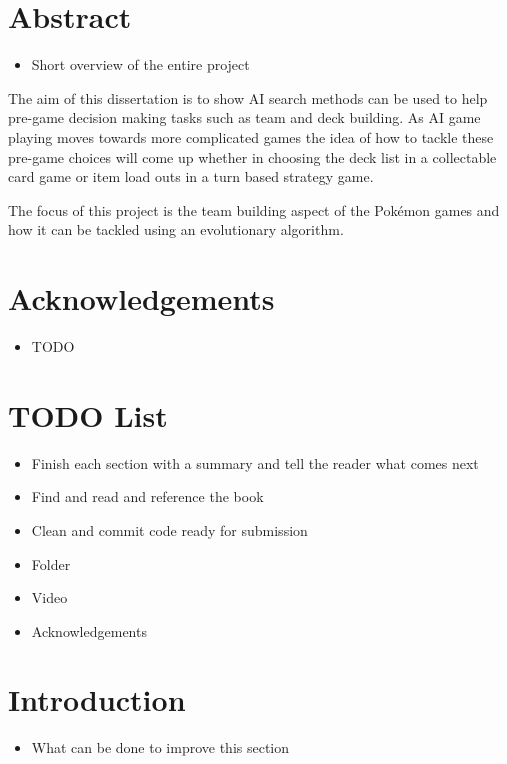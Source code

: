 \documentclass[a4paper]{article}
\newcommand{\Pokemon}{Pok\'{e}mon}
\begin{document}
\setcounter{page}{1}

\section*{Abstract}
\begin{itemize}
    \item Short overview of the entire project
\end{itemize}
The aim of this dissertation is to show AI search methods can be used to help pre-game decision making tasks such as team and deck building.
As AI game playing moves towards more complicated games the idea of how to tackle these pre-game choices will come up whether in choosing the deck list in a collectable card game or item load outs in a turn based strategy game.
\par
The focus of this project is the team building aspect of the \Pokemon{} games and how it can be tackled using an evolutionary algorithm.
\vfill
\section*{Acknowledgements}
\begin{itemize}
    \item TODO
\end{itemize}

\vfill
\section*{TODO List}
\begin{itemize}
    \item Finish each section with a summary and tell the reader what comes next
	\item Find and read and reference the book
	\item Clean and commit code ready for submission
	\item Folder
	\item Video
	\item Acknowledgements
\end{itemize}

\pagebreak

\tableofcontents
\pagebreak
\setcounter{page}{1}

\section{Introduction}
\begin{itemize}
	\item What can be done to improve this section
\end{itemize}
\end{document}
